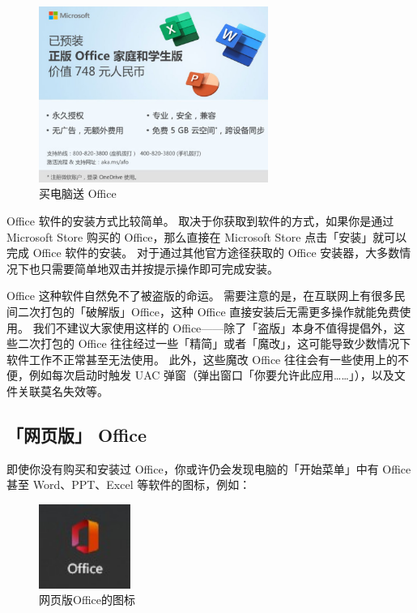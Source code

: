 \begin{figure}[htb!]
  \centering
  \includegraphics[width=7.5cm]{assets/JD_Office_Gift.jpg}
  \caption{买电脑送 Office}
  \label{JD_Office_Gift}
\end{figure}

Office 软件的安装方式比较简单。
取决于你获取到软件的方式，如果你是通过 Microsoft Store 购买的 Office，那么直接在 Microsoft Store 点击「安装」就可以完成 Office 软件的安装。
对于通过其他官方途径获取的 Office 安装器，大多数情况下也只需要简单地双击并按提示操作即可完成安装。

Office 这种软件自然免不了被盗版的命运。
需要注意的是，在互联网上有很多民间二次打包的「破解版」Office，这种 Office 直接安装后无需更多操作就能免费使用。
我们不建议大家使用这样的 Office——除了「盗版」本身不值得提倡外，这些二次打包的 Office 往往经过一些「精简」或者「魔改」，这可能导致少数情况下软件工作不正常甚至无法使用。
此外，这些魔改 Office 往往会有一些使用上的不便，例如每次启动时触发 UAC 弹窗（弹出窗口「你要允许此应用……」），以及文件关联莫名失效等。

\subsection{「网页版」 Office}

即使你没有购买和安装过 Office，你或许仍会发现电脑的「开始菜单」中有 Office 甚至 Word、PPT、Excel 等软件的图标，例如：

\begin{figure}[htb!]
  \centering
  \includegraphics[width=3cm]{assets/Office_Web_Icon.jpg}
  \caption{网页版Office的图标}
  \label{Office_Web_Icon}
\end{figure}

